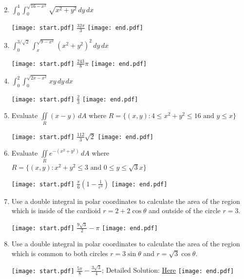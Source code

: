 \documentclass[12pt]{article}
\begin{document}

\begin{enumerate}
\setcounter{enumi}{1}

\item $\int_0^{4} \int_0^{\sqrt{16-x^2}} \sqrt{x^2+y^2} \,dy \,dx$

\texttt{[image: start.pdf]}
{{$\frac{32\pi}{3}$}}
\texttt{[image: end.pdf]}


\item $\int_0^{3/\sqrt{2}} \int_x^{\sqrt{9-x^2}} \left(x^2+y^2\right)^2 \,dy \,dx$

\texttt{[image: start.pdf]}
{{$\frac{243}{8}\pi$}}
\texttt{[image: end.pdf]}


\item $\int_0^{2} \int_0^{\sqrt{2x-x^2}} xy \,dy \,dx$

\texttt{[image: start.pdf]}
{{$\frac{2}{3}$}}
\texttt{[image: end.pdf]}


\item Evaluate $\iint \limits_{R} (x-y) \,dA$ where $R=\{(x,y): 4 \leq x^2+y^2 \leq 16 \text{ and } y \leq x\}$

\texttt{[image: start.pdf]}
{{$\frac{112}{3}\sqrt{2}$}}
\texttt{[image: end.pdf]}


\item Evaluate $\iint \limits_{R} e^{-(x^2+y^2)} \,dA$ where $R=\{(x,y): x^2+y^2 \leq 3 \text{ and } 0 \leq y \leq \sqrt{3}x\}$

\texttt{[image: start.pdf]}
{{$\frac{\pi}{6}\left(1-\frac{1}{e^3}\right)$}}
\texttt{[image: end.pdf]}


\item Use a double integral in polar coordinates to calculate the area of the region which is inside of the cardioid $r=2+2\cos{\theta}$ and outside of the circle $r=3$.

\texttt{[image: start.pdf]}
{{$\frac{9\sqrt{3}}{2}-\pi$}}
\texttt{[image: end.pdf]}


\item Use a double integral in polar coordinates to calculate the area of the region which is common to both circles $r=3\sin{\theta}$ and $r=\sqrt{3}\cos{\theta}$.

\texttt{[image: start.pdf]}
{{$\frac{5\pi}{8}-\frac{3\sqrt{3}}{4}$; Detailed Solution: \textcolor{blue}{\href{http://www.math.drexel.edu/classes/Calculus/resources/Math200HW/Solutions/18_200_DI_Polar_08.pdf}{Here}}}}
\texttt{[image: end.pdf]}



\end{enumerate}
\end{document}
